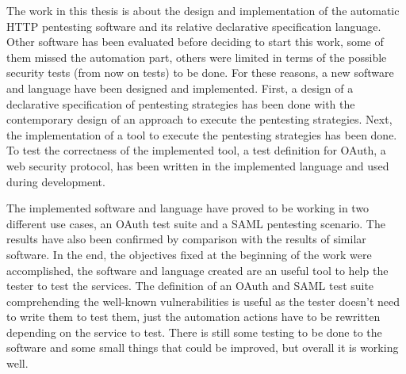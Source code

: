 The work in this thesis is about the design and implementation of the automatic HTTP pentesting software and its relative declarative specification language. Other software has been evaluated before deciding to start this work, some of them missed the automation part, others were limited in terms of the possible security tests (from now on tests) to be done. For these reasons, a new software and language have been designed and implemented. First, a design of a declarative specification of pentesting strategies has been done with the contemporary design of an approach to execute the pentesting strategies. Next, the implementation of a tool to execute the pentesting strategies has been done. To test the correctness of the implemented tool, a test definition for \gls{OAuth}, a web security protocol, has been written in the implemented language and used during development.

The implemented software and language have proved to be working in two different use cases, an OAuth test suite and a SAML pentesting scenario. The results have also been confirmed by comparison with the results of similar software. In the end, the objectives fixed at the beginning of the work were accomplished, the software and language created are an useful tool to help the tester to test the services. The definition of an OAuth and SAML test suite comprehending the well-known vulnerabilities is useful as the tester doesn't need to write them to test them, just the automation actions have to be rewritten depending on the service to test. There is still some testing to be done to the software and some small things that could be improved, but overall it is working well.






